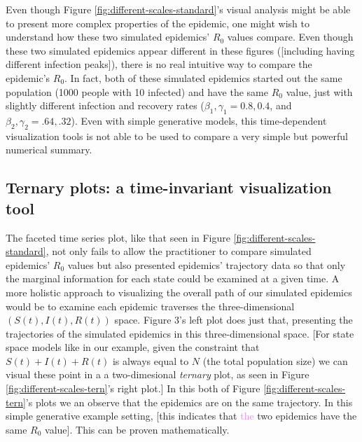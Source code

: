 \documentclass[
  shortnames]{jss}
\begin{document}
Even though Figure \ref{fig:different-scales-standard}'s visual analysis
might be able to present more complex properties of the epidemic, one
might wish to understand how these two simulated epidemics' \(R_0\)
values compare. Even though these two simulated epidemics appear
different in these figures ({[}including having different infection
peaks{]}), there is no real intuitive way to compare the epidemic's
\(R_0\). In fact, both of these simulated epidemics started out the same
population (1000 people with 10 infected) and have the same \(R_0\)
value, just with slightly different infection and recovery rates
(\(\beta_1, \gamma_1 = 0.8, 0.4\), and
\(\beta_2, \gamma_2 = .64, .32\)). Even with simple generative models,
this time-dependent visualization tools is not able to be used to
compare a very simple but powerful numerical summary.

\hypertarget{ternary-plots-a-time-invariant-visualization-tool}{%
\subsection{Ternary plots: a time-invariant visualization
tool}\label{ternary-plots-a-time-invariant-visualization-tool}}

The faceted time series plot, like that seen in Figure
\ref{fig:different-scales-standard}, not only fails to allow the
practitioner to compare simulated epidemics' \(R_0\) values but also
presented epidemics' trajectory data so that only the marginal
information for each state could be examined at a given time. A more
holistic approach to visualizing the overall path of our simulated
epidemics would be to examine each epidemic traverses the
three-dimensional \((S(t),I(t),R(t))\) space. Figure 3's left plot does
just that, presenting the trajectories of the simulated epidemics in
this three-dimensional space. {[}For state space models like in our
example, given the constraint that \(S(t) + I(t)+R(t)\) is always equal
to \(N\) (the total population size) we can visual these point in a a
two-dimesional \textit{ternary} plot, as seen in Figure
\ref{fig:different-scales-tern}'s right plot.{]} In this both of Figure
\ref{fig:different-scales-tern}'s plots we an observe that the epidemics
are on the same trajectory. In this simple generative example setting,
{[}this indicates that \textcolor{violet}{the} two epidemics have the
same \(R_0\) value{]}. This can be proven mathematically.
\end{document}
